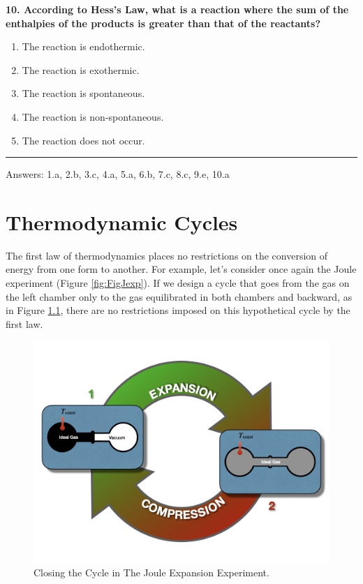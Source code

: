 \documentclass[
  9pt,
]{extbook}
\providecommand{\tightlist}{%
  \setlength{\itemsep}{0pt}\setlength{\parskip}{0pt}}
\theoremstyle{definition}
\theoremstyle{definition}
\theoremstyle{definition}
\theoremstyle{definition}
\theoremstyle{remark}
\begin{document}
\textbf{10. According to Hess's Law, what is a reaction where the sum of the enthalpies of the products is greater than that of the reactants?}

\begin{enumerate}
\def\labelenumi{\alph{enumi}.}
\tightlist
\item
  The reaction is endothermic.
\item
  The reaction is exothermic.
\item
  The reaction is spontaneous.
\item
  The reaction is non-spontaneous.
\item
  The reaction does not occur.
\end{enumerate}

\begin{center}\rule{0.5\linewidth}{0.5pt}\end{center}

Answers: 1.a, 2.b, 3.c, 4.a, 5.a, 6.b, 7.c, 8.c, 9.e, 10.a

\chapter{Thermodynamic Cycles}\label{ThermodynamicCycles}

The first law of thermodynamics places no restrictions on the conversion of energy from one form to another. For example, let's consider once again the Joule experiment (Figure \ref{fig:FigJexp}). If we design a cycle that goes from the gas on the left chamber only to the gas equilibrated in both chambers and backward, as in Figure \ref{fig:FigJexpC}, there are no restrictions imposed on this hypothetical cycle by the first law.

\begin{figure}

{\centering \includegraphics[width=0.8\linewidth]{./img/OEP_Figures.008} 

}

\caption{Closing the Cycle in The Joule Expansion Experiment.}\label{fig:FigJexpC}
\end{figure}
\end{document}
